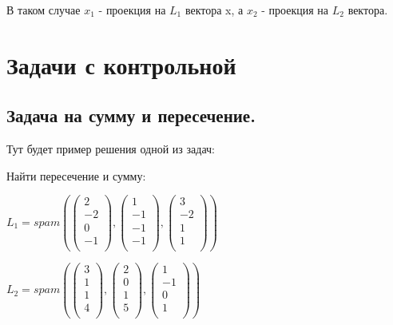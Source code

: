 \documentclass{article}
\begin{document}
В таком случае $x_1$ - проекция на $L_1$ вектора x, а $x_2$ - проекция на $L_2$ вектора.

\pagebreak
\section{Задачи с контрольной}

\subsection{Задача на сумму и пересечение.}

Тут будет пример решения одной из задач:

Найти пересечение и сумму:

$L_1 = spam (\begin{pmatrix}
    2 \\
    -2 \\
    0 \\
    -1 \\
\end{pmatrix}, \begin{pmatrix}
    1 \\
    -1 \\
    -1\\
    -1 \\
\end{pmatrix}, \begin{pmatrix}
    3 \\
    -2 \\
    1\\
    1 \\
\end{pmatrix})$

$L_2 = spam (\begin{pmatrix}
    3 \\
    1 \\
    1 \\
    4 \\
\end{pmatrix}, \begin{pmatrix}
    2 \\
    0 \\
    1\\
    5 \\
\end{pmatrix}, \begin{pmatrix}
    1 \\
    -1 \\
    0\\
    1 \\
\end{pmatrix})$
\end{document}
